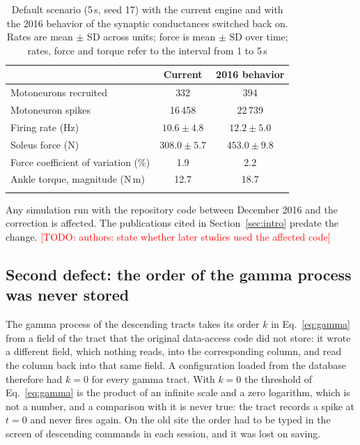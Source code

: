 \documentclass[pdflatex,sn-apa,iicol]{sn-jnl}
\newcommand{\TODO}[1]{\textcolor{red}{[TODO: #1]}}
\begin{document}
\begin{table}[t]
\caption{Default scenario (5\,s, seed 17) with the current engine and with the 2016 behavior of the synaptic conductances switched back on. Rates are mean $\pm$ SD across units; force is mean $\pm$ SD over time; rates, force and torque refer to the interval from 1 to 5\,s}\label{tab:defect}
\begin{tabular}{@{}lcc@{}}
\toprule
 & Current & 2016 behavior \\
\midrule
Motoneurons recruited & 332 & 394 \\
Motoneuron spikes & 16\,458 & 22\,739 \\
Firing rate (Hz) & $10.6 \pm 4.8$ & $12.2 \pm 5.0$ \\
Soleus force (N) & $308.0 \pm 5.7$ & $453.0 \pm 9.8$ \\
Force coefficient of variation (\%) & 1.9 & 2.2 \\
Ankle torque, magnitude (N\,m) & 12.7 & 18.7 \\
\botrule
\end{tabular}
\end{table}

Any simulation run with the repository code between December 2016 and the correction is affected. The publications cited in Section~\ref{sec:intro} predate the change. \TODO{authors: state whether later studies used the affected code}

\subsection{Second defect: the order of the gamma process was never stored}\label{sec:gamma}

The gamma process of the descending tracts takes its order $k$ in Eq.~\eqref{eq:gamma} from a field of the tract that the original data-access code did not store: it wrote a different field, which nothing reads, into the corresponding column, and read the column back into that same field. A configuration loaded from the database therefore had $k = 0$ for every gamma tract. With $k = 0$ the threshold of Eq.~\eqref{eq:gamma} is the product of an infinite scale and a zero logarithm, which is not a number, and a comparison with it is never true: the tract records a spike at $t = 0$ and never fires again. On the old site the order had to be typed in the screen of descending commands in each session, and it was lost on saving.
\end{document}
